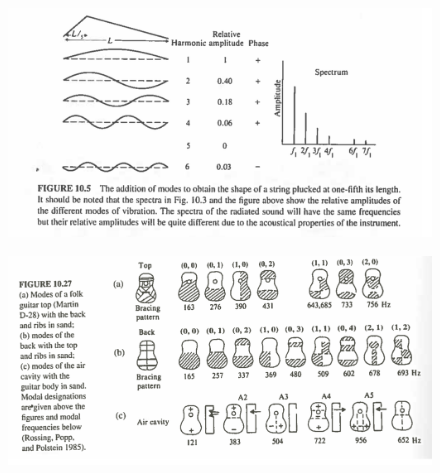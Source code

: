 \documentclass{article}
\begin{document}
\begin{figure}[H]
    \centering
    \includegraphics[scale = 0.8]{figures/fig10_5.png}
\end{figure}

\begin{figure}[H]
    \centering
    \includegraphics[scale = 0.8]{figures/fig10_27.png}
\end{figure}
\end{document}
